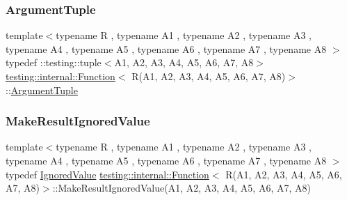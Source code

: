 \subsubsection{\texorpdfstring{ArgumentTuple}{ArgumentTuple}}
{\footnotesize\ttfamily template$<$typename R , typename A1 , typename A2 , typename A3 , typename A4 , typename A5 , typename A6 , typename A7 , typename A8 $>$ \\
typedef \+::testing\+::tuple$<$A1, A2, A3, A4, A5, A6, A7, A8$>$ \mbox{\hyperlink{structtesting_1_1internal_1_1_function}{testing\+::internal\+::\+Function}}$<$ R(A1, A2, A3, A4, A5, A6, A7, A8)$>$\+::\mbox{\hyperlink{structtesting_1_1internal_1_1_function_3_01_r_07_08_4_ad483c3128c470d8cdb55c3ac1c575c11}{Argument\+Tuple}}}

\mbox{\label{structtesting_1_1internal_1_1_function_3_01_r_07_a1_00_01_a2_00_01_a3_00_01_a4_00_01_a5_00_01_a6_00_01_a7_00_01_a8_08_4_a845b40c19850bfb84cdd778e2fb51b3d}} 
\subsubsection{\texorpdfstring{MakeResultIgnoredValue}{MakeResultIgnoredValue}}
{\footnotesize\ttfamily template$<$typename R , typename A1 , typename A2 , typename A3 , typename A4 , typename A5 , typename A6 , typename A7 , typename A8 $>$ \\
typedef \mbox{\hyperlink{classtesting_1_1internal_1_1_ignored_value}{Ignored\+Value}} \mbox{\hyperlink{structtesting_1_1internal_1_1_function}{testing\+::internal\+::\+Function}}$<$ R(A1, A2, A3, A4, A5, A6, A7, A8)$>$\+::Make\+Result\+Ignored\+Value(A1, A2, A3, A4, A5, A6, A7, A8)}

\mbox{\label{structtesting_1_1internal_1_1_function_3_01_r_07_a1_00_01_a2_00_01_a3_00_01_a4_00_01_a5_00_01_a6_00_01_a7_00_01_a8_08_4_a421404d7553350ee8a1890a21d9fbc55}} 

